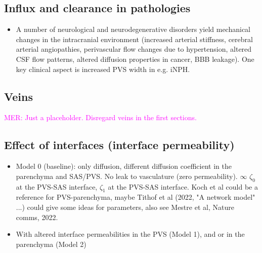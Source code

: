 \documentclass[fleqn,10pt]{wlscirep}
\newcommand{\mer}[1]{\textcolor{magenta}{#1}}
\newcommand{\draft}[1]{\textcolor{gray}{#1}}
\begin{document}
\draft{\lipsum[1]}

\subsection*{Influx and clearance in pathologies}

\begin{itemize}
\item
  A number of neurological and neurodegenerative disorders yield mechanical changes in the intracranial environment (increased arterial stiffness, cerebral arterial angiopathies, perivascular flow changes due to hypertension, altered CSF flow patterns, altered diffusion properties in cancer, BBB leakage). One key clinical aspect is increased PVS width in e.g. iNPH. 
\end{itemize}

\draft{\lipsum[1]}

\subsection*{Veins}

\mer{MER: Just a placeholder. Disregard veins in the first sections.}


\iffalse
\newpage
\subsection*{Effect of interfaces (interface permeability)}

\begin{itemize}
    \item Model 0 (baseline): only diffusion, different diffusion coefficient in the parenchyma and SAS/PVS. No leak to vasculature (zero permeability). $\infty$ $\zeta_0$ at the PVS-SAS interface, $\zeta_1$ at the PVS-SAS interface. Koch et al could be a reference for PVS-parenchyma, maybe Tithof et al (2022, "A network model" ...) could give some ideas for parameters, also see Mestre et al, Nature comms, 2022. 
    \item 
    With altered interface permeabilities in the PVS (Model 1), and or in the parenchyma (Model 2) 
    \end{itemize}

\begin{figure}
    \caption{}
    \label{fig:1}
\end{figure}
\end{document}
